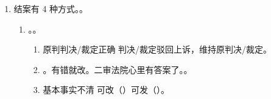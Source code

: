 \begin{enumerate}
\begin{enumerate}
                \begin{enumerate}
                  \item {}/必须参加的当事人、一审不给离，二审给离。
                        \begin{enumerate}
                          \item {}。
                                。
                          \item {}。
                          \item {}。
                          \item {}。
                        \end{enumerate}
                  \item {}。
                        \begin{enumerate}
                          \item {}。
                          \item + 一个二审给离。。
                        \end{enumerate}
                  \item 小技巧。一审法院或多或少有错的/没错的 \yjt 调解不成 \yjt 发回重审/告知另诉。
                  \item 既有情形 1，又有情形 2 \yjt 分别处理。。
                \end{enumerate}
        \end{enumerate}
  \item 结案有 4 种方式。。
        \begin{enumerate}
          \item {}。。
                \begin{enumerate}
                  \item 原判判决/裁定正确 \yjt 判决/裁定驳回上诉，维持原判决/裁定。
                  \item {}。有错就改。二审法院心里有答案了。。
                  \item 基本事实不清 \yjt 可改（）可发（）。

\end{enumerate}
\end{enumerate}
\end{enumerate}
